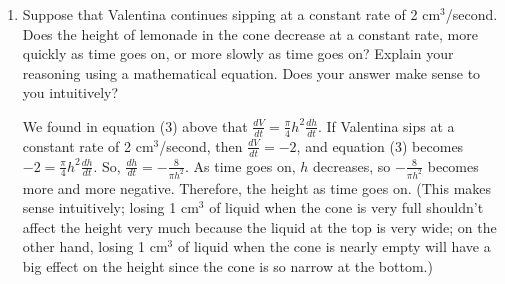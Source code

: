 \documentclass{article}
\begin{document}
\begin{enumerate}
\begin{enumerate}
\begin{solution}

      \begin{align}
        \frac{d}{dt} (V) &= \frac{d}{dt} \left( \frac{\pi}{12} h^3
        \right) \nonumber \\
        \frac{dV}{dt} &= \frac{\pi}{4} h^2 \frac{dh}{dt}
\\
        \intertext{At the moment we're interested in, $\frac{dV}{dt} = -2$
          and $h = 10$:} %
        -2 &= \frac{\pi}{4} \cdot 10^2 \cdot
        \frac{dh}{dt} \nonumber 
      \end{align}
      So, $\displaystyle \frac{dh}{dt} = - \frac{2}{25 \pi}$.  So, at the
      time we're interested in, the height of lemonade is
      \begin{center}
      \end{center}      
    \end{solution}

  \item
    \begin{problem}[\nstretch{1}]
      Suppose that Valentina continues sipping at a constant rate of 2
      cm$^3$/second.  Does the height of lemonade in the cone decrease at
      a constant rate, more quickly as time goes on, or more slowly as
      time goes on?  Explain your reasoning using a mathematical equation.
      Does your answer make sense to you intuitively?
    \end{problem}

    \begin{solution}
      We found in equation (3) above
      that $\frac{dV}{dt}=\frac{\pi}{4} h^2 \frac{dh}{dt}$.  If Valentina
      sips at a constant rate of 2 cm$^3$/second, then $\frac{dV}{dt} =
      -2$, and equation (3) becomes
      $-2 = \frac{\pi}{4} h^2 \frac{dh}{dt}$.  So, $\frac{dh}{dt} = -
      \frac{8}{\pi h^2}$.  As time goes on, $h$ decreases, so $-
      \frac{8}{\pi h^2}$ becomes more and more negative.  Therefore, the
      height  as time goes on.  (This makes
      sense intuitively; losing 1 cm$^3$ of liquid when the cone is very
      full shouldn't affect the height very much because the liquid at the
      top is very wide; on the other hand, losing 1 cm$^3$ of liquid when
      the cone is nearly empty will have a big effect on the height since
      the cone is so narrow at the bottom.)
    \end{solution}


\end{enumerate}
\end{enumerate}
\end{document}
